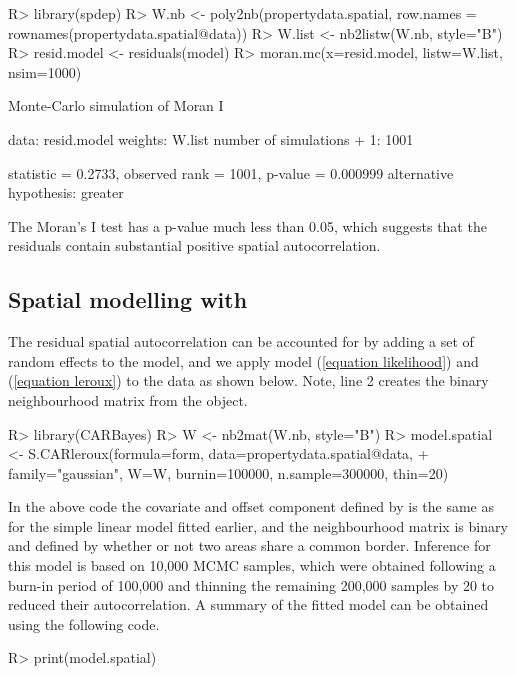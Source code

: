 \documentclass[article,shortnames,nojss]{jss}
\begin{document}
\begin{Schunk}
\begin{Sinput}
R> library(spdep)
R> W.nb <- poly2nb(propertydata.spatial, row.names = rownames(propertydata.spatial@data))
R> W.list <- nb2listw(W.nb, style="B")
R> resid.model <- residuals(model)
R> moran.mc(x=resid.model, listw=W.list, nsim=1000)
\end{Sinput}
\begin{Soutput}
	Monte-Carlo simulation of Moran I

data:  resid.model 
weights: W.list  
number of simulations + 1: 1001 

statistic = 0.2733, observed rank = 1001, p-value = 0.000999
alternative hypothesis: greater
\end{Soutput}
\end{Schunk}
    
    
The Moran's I test has  a p-value much less than 0.05, which suggests that the residuals contain substantial positive spatial autocorrelation.


\subsection[Spatial modelling with CARBayes]{Spatial modelling with }
The residual spatial autocorrelation can be accounted for by adding a set of random effects to the model, and we apply model (\ref{equation likelihood}) and  (\ref{equation leroux}) to the data as shown below. Note, line 2 creates the binary neighbourhood matrix  from the  object.


\begin{CodeInput}
R> library(CARBayes)
R> W <- nb2mat(W.nb, style="B")
R> model.spatial <- S.CARleroux(formula=form, data=propertydata.spatial@data, 
+   family="gaussian", W=W, burnin=100000, n.sample=300000, thin=20)
\end{CodeInput}

In the above code the covariate and offset component defined by  is the same as for the simple linear model fitted earlier, and the neighbourhood matrix  is binary and defined by whether or not two areas share a common border. Inference for this model is based on 10,000 MCMC samples, which were obtained following a burn-in period of 100,000 and thinning the remaining 200,000 samples by 20 to reduced their autocorrelation. A summary of the fitted model can be obtained using the following code.

\begin{CodeInput}
R> print(model.spatial)
\end{CodeInput}
\end{document}
